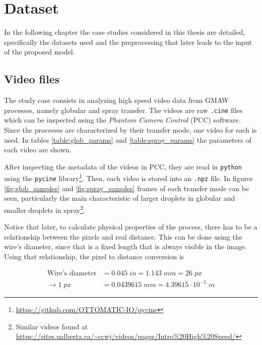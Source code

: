 \chapter{Dataset}\label{chap:dataset}
In the following chapter the case studies considered in this thesis are detailed, specifically the datasets used and the preprocessing that later leads to the input of the proposed model.

\section{Video files}
The study case consists in analyzing high speed video data from GMAW processes, namely globular and spray transfer. The videos are raw \texttt{.cine} files which can be inspected using the \textit{Phantom Camera Control} (PCC) software. Since the processes are characterized by their transfer mode, one video for each is used. In tables \ref{table:glob_params} and \ref{table:spray_params} the parameters of each video are shown. 

After inspecting the metadata of the videos in PCC, they are read in \texttt{python} using the \texttt{pycine} library\footnote{\url{https://github.com/OTTOMATIC-IO/pycine}}. Then, each video is stored into an \texttt{.npz} file. In figures \ref{fig:glob_samples} and \ref{fig:spray_samples} frames of each transfer mode can be seen, particularly the main characteristic of larger droplets in globular and smaller droplets in spray\footnote{Similar videos found at \url{https://sites.ualberta.ca/~ccwj/videos/pages/Intro\%20High\%20Speed/}}.

Notice that later, to calculate physical properties of the process, there has to be a relationship between the pixels and real distance. This can be done using the wire's diameter, since that is a fixed length that is always visible in the image. Using that relationship, the pixel to distance conversion is

\begin{align}
    \text{Wire's diameter} &= 0.045\;in = 1.143\;mm = 26\;px \nonumber\\
    \xrightarrow{}1\;px &= 0.0439615\;mm =4.39615\cdot 10^{-5}\;m
    \label{eq:px_to_mm}
\end{align}

